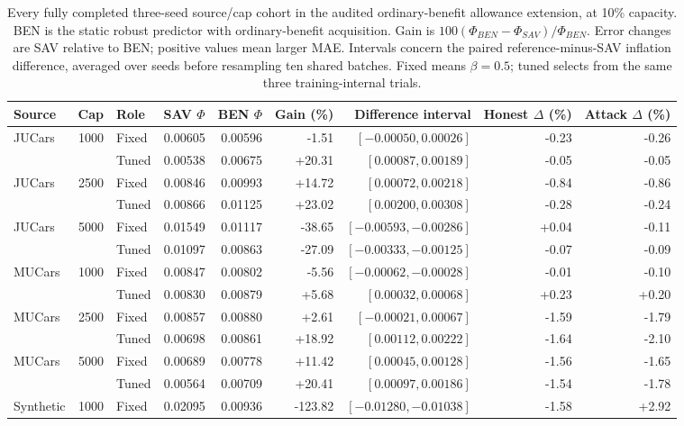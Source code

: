 \documentclass[10pt,journal]{IEEEtran}
\begin{document}
\begin{table}[t]
\centering
\caption{Every fully completed three-seed source/cap cohort in the audited
ordinary-benefit allowance extension, at 10\% capacity. BEN is the static robust
predictor with ordinary-benefit acquisition. Gain is $100(\Phi_{BEN}-\Phi_{SAV})/
\Phi_{BEN}$. Error changes are SAV relative to BEN; positive values mean larger
MAE. Intervals concern the paired reference-minus-SAV inflation difference,
averaged over seeds before resampling ten shared batches. Fixed means
$\beta=0.5$; tuned selects from the same three training-internal trials.}
\label{tab:equal_benefit_reference}
\small
\begin{tabular}{lrlrrrrrr}
\toprule
Source & Cap & Role & SAV $\Phi$ & BEN $\Phi$ & Gain (\%) & Difference interval & Honest $\Delta$ (\%) & Attack $\Delta$ (\%)\\
\midrule
JUCars & 1000 & Fixed & 0.00605 & 0.00596 & -1.51 & $[-0.00050,0.00026]$ & -0.23 & -0.26\\
 &  & Tuned & 0.00538 & 0.00675 & +20.31 & $[0.00087,0.00189]$ & -0.05 & -0.05\\
\midrule
JUCars & 2500 & Fixed & 0.00846 & 0.00993 & +14.72 & $[0.00072,0.00218]$ & -0.84 & -0.86\\
 &  & Tuned & 0.00866 & 0.01125 & +23.02 & $[0.00200,0.00308]$ & -0.28 & -0.24\\
\midrule
JUCars & 5000 & Fixed & 0.01549 & 0.01117 & -38.65 & $[-0.00593,-0.00286]$ & +0.04 & -0.11\\
 &  & Tuned & 0.01097 & 0.00863 & -27.09 & $[-0.00333,-0.00125]$ & -0.07 & -0.09\\
\midrule
MUCars & 1000 & Fixed & 0.00847 & 0.00802 & -5.56 & $[-0.00062,-0.00028]$ & -0.01 & -0.10\\
 &  & Tuned & 0.00830 & 0.00879 & +5.68 & $[0.00032,0.00068]$ & +0.23 & +0.20\\
\midrule
MUCars & 2500 & Fixed & 0.00857 & 0.00880 & +2.61 & $[-0.00021,0.00067]$ & -1.59 & -1.79\\
 &  & Tuned & 0.00698 & 0.00861 & +18.92 & $[0.00112,0.00222]$ & -1.64 & -2.10\\
\midrule
MUCars & 5000 & Fixed & 0.00689 & 0.00778 & +11.42 & $[0.00045,0.00128]$ & -1.56 & -1.65\\
 &  & Tuned & 0.00564 & 0.00709 & +20.41 & $[0.00097,0.00186]$ & -1.54 & -1.78\\
\midrule
Synthetic & 1000 & Fixed & 0.02095 & 0.00936 & -123.82 & $[-0.01280,-0.01038]$ & -1.58 & +2.92\\

\end{tabular}
\end{table}
\end{document}
